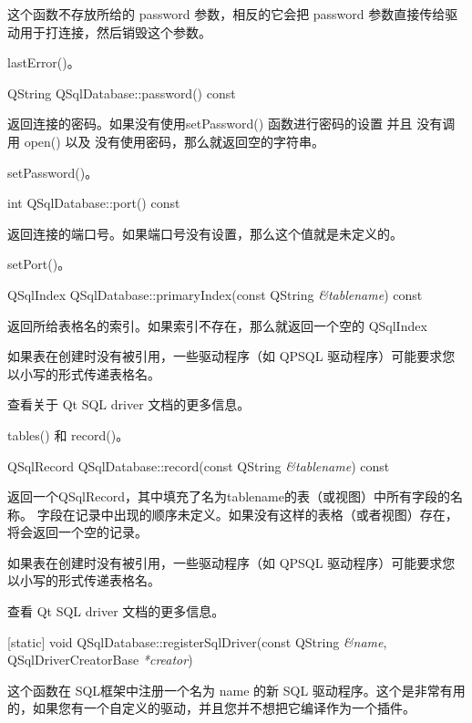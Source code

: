 这个函数不存放所给的 password 参数，相反的它会把 password 参数直接传给驱动用于打连接，然后销毁这个参数。

\begin{seeAlso}
lastError()。
\end{seeAlso}

QString QSqlDatabase::password() const


返回连接的密码。如果没有使用setPassword() 函数进行密码的设置 并且 没有调用 open() 以及 没有使用密码，那么就返回空的字符串。


\begin{seeAlso}
setPassword()。
\end{seeAlso}

int QSqlDatabase::port() const


返回连接的端口号。如果端口号没有设置，那么这个值就是未定义的。

\begin{seeAlso}
setPort()。
\end{seeAlso}

QSqlIndex QSqlDatabase::primaryIndex(const QString \emph{\&tablename}) const


返回所给表格名的索引。如果索引不存在，那么就返回一个空的 QSqlIndex

\begin{notice}
如果表在创建时没有被引用，一些驱动程序（如 QPSQL 驱动程序）可能要求您以小写的形式传递表格名。
\end{notice}


查看关于 Qt SQL driver 文档的更多信息。

\begin{seeAlso}
tables() 和 record()。
\end{seeAlso}


QSqlRecord QSqlDatabase::record(const QString \emph{\&tablename}) const


返回一个QSqlRecord，其中填充了名为tablename的表（或视图）中所有字段的名称。
字段在记录中出现的顺序未定义。如果没有这样的表格（或者视图）存在，将会返回一个空的记录。

\begin{notice}
如果表在创建时没有被引用，一些驱动程序（如 QPSQL 驱动程序）可能要求您以小写的形式传递表格名。
\end{notice}


查看 Qt SQL driver 文档的更多信息。

[static] void QSqlDatabase::registerSqlDriver(const QString \emph{\&name}, QSqlDriverCreatorBase \emph{*creator})

这个函数在 SQL框架中注册一个名为 name 的新 SQL 驱动程序。这个是非常有用的，如果您有一个自定义的驱动，并且您并不想把它编译作为一个插件。

